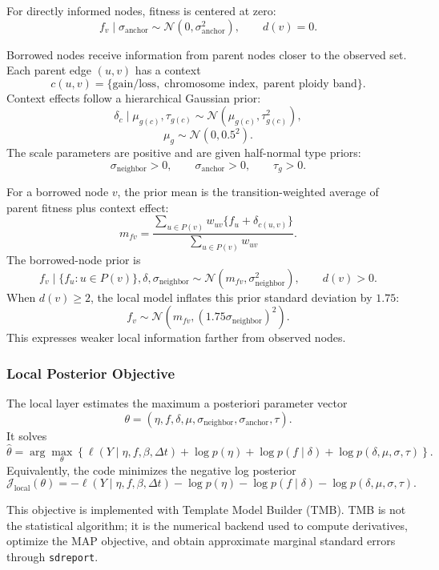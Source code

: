 \documentclass[11pt]{article}
\newcommand{\Normal}{\mathcal{N}}
\begin{document}
For directly informed nodes, fitness is centered at zero:
\[
  f_v\mid \sigma_{\mathrm{anchor}}
  \sim
  \Normal(0,\sigma_{\mathrm{anchor}}^2),
  \qquad d(v)=0.
\]

Borrowed nodes receive information from parent nodes closer to the observed
set. Each parent edge $(u,v)$ has a context
\[
  c(u,v)
  =
  \{\text{gain/loss},\;\text{chromosome index},\;\text{parent ploidy band}\}.
\]
Context effects follow a hierarchical Gaussian prior:
\[
  \delta_c\mid \mu_{g(c)},\tau_{g(c)}
  \sim
  \Normal(\mu_{g(c)},\tau_{g(c)}^2),
\]
\[
  \mu_g\sim \Normal(0,0.5^2).
\]
The scale parameters are positive and are given half-normal type priors:
\[
  \sigma_{\mathrm{neighbor}}>0,\qquad
  \sigma_{\mathrm{anchor}}>0,\qquad
  \tau_g>0.
\]

For a borrowed node $v$, the prior mean is the transition-weighted average of
parent fitness plus context effect:
\[
  m_{fv}
  =
  \frac{
    \sum_{u\in P(v)}
    w_{uv}\{f_u+\delta_{c(u,v)}\}
  }{
    \sum_{u\in P(v)}w_{uv}
  }.
\]
The borrowed-node prior is
\[
  f_v\mid \{f_u:u\in P(v)\},\delta,\sigma_{\mathrm{neighbor}}
  \sim
  \Normal(m_{fv},\sigma_{\mathrm{neighbor}}^2),
  \qquad d(v)>0.
\]
When $d(v)\ge 2$, the local model inflates this prior standard deviation by
$1.75$:
\[
  f_v \sim \Normal(m_{fv},(1.75\sigma_{\mathrm{neighbor}})^2).
\]
This expresses weaker local information farther from observed nodes.

\subsubsection{Local Posterior Objective}

The local layer estimates the maximum a posteriori parameter vector
\[
  \theta=(\eta,f,\delta,\mu,\sigma_{\mathrm{neighbor}},
  \sigma_{\mathrm{anchor}},\tau).
\]
It solves
\[
  \hat\theta
  =
  \arg\max_{\theta}
  \left\{
    \ell(Y\mid \eta,f,\beta,\Delta t)
    +
    \log p(\eta)
    +
    \log p(f\mid \delta)
    +
    \log p(\delta,\mu,\sigma,\tau)
  \right\}.
\]
Equivalently, the code minimizes the negative log posterior
\[
  \mathcal{J}_{\mathrm{local}}(\theta)
  =
  -\ell(Y\mid \eta,f,\beta,\Delta t)
  -
  \log p(\eta)
  -
  \log p(f\mid \delta)
  -
  \log p(\delta,\mu,\sigma,\tau).
\]

This objective is implemented with Template Model Builder (TMB). TMB is not the
statistical algorithm; it is the numerical backend used to compute derivatives,
optimize the MAP objective, and obtain approximate marginal standard errors
through \texttt{sdreport}.
\end{document}
